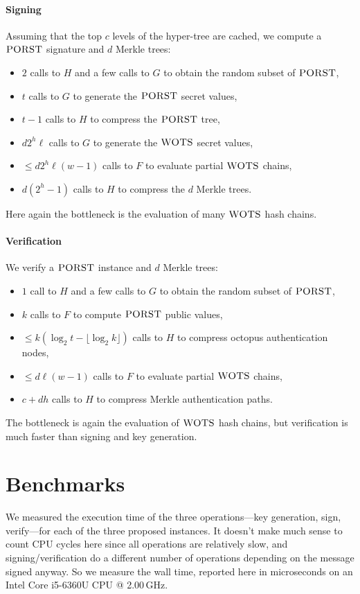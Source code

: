 \paragraph{Signing}
Assuming that the top $c$ levels of the hyper-tree are cached, we compute a $\textsc{PORST}$ signature and $d$ Merkle trees:
\begin{itemize}
\item $2$ calls to $H$ and a few calls to $G$ to obtain the random subset of $\textsc{PORST}$,
\item $t$ calls to $G$ to generate the $\textsc{PORST}$ secret values,
\item $t-1$ calls to $H$ to compress the $\textsc{PORST}$ tree,
\item $d 2^h \ell$ calls to $G$ to generate the $\textsc{WOTS}$ secret values,
\item $\le d 2^h \ell (w-1)$ calls to $F$ to evaluate partial $\textsc{WOTS}$ chains,
\item $d (2^h-1)$ calls to $H$ to compress the $d$ Merkle trees.
\end{itemize}
Here again the bottleneck is the evaluation of many $\textsc{WOTS}$ hash chains.

\paragraph{Verification}
We verify a $\textsc{PORST}$ instance and $d$ Merkle trees:
\begin{itemize}
\item $1$ call to $H$ and a few calls to $G$ to obtain the random subset of $\textsc{PORST}$,
\item $k$ calls to $F$ to compute $\textsc{PORST}$ public values,
\item $\le k(\log_2{t} - \lfloor \log_2{k} \rfloor)$ calls to $H$ to compress octopus authentication nodes,
\item $\le d \ell (w-1)$ calls to $F$ to evaluate partial $\textsc{WOTS}$ chains,
\item $c + dh$ calls to $H$ to compress Merkle authentication paths.
\end{itemize}
The bottleneck is again the evaluation of $\textsc{WOTS}$ hash chains, but verification is much faster than signing and key generation.


\section{Benchmarks}

We measured the execution time of the three operations---key generation, sign, verify---for each of the three proposed instances.
It doesn't make much sense to count CPU cycles here since all operations are relatively slow, and signing/verification do a different number of operations depending on the message signed anyway.
So we measure the wall time, reported here in microseconds on an Intel Core i5-6360U CPU @ 2.00\,GHz.

